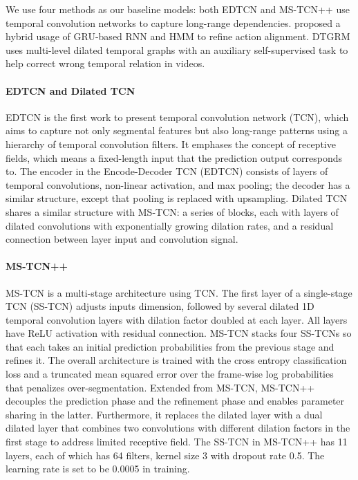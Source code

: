We use four methods as our baseline models: both EDTCN \cite{8099596} and MS-TCN++ \cite{9186840} use temporal convolution networks to capture long-range dependencies. \cite{8099623} proposed a hybrid usage of GRU-based RNN and HMM to refine action alignment. DTGRM \cite{wang2020temporal} uses multi-level dilated temporal graphs with an auxiliary self-supervised task to help correct wrong temporal relation in videos.

\paragraph{EDTCN and Dilated TCN}
EDTCN \cite{8099596} is the first work to present temporal convolution network (TCN), which aims to capture not only segmental features but also long-range patterns using a hierarchy of temporal convolution filters. It emphases the concept of receptive fields, which means a fixed-length input that the prediction output corresponds to. The encoder in the Encode-Decoder TCN (EDTCN) consists of layers of temporal convolutions, non-linear activation, and max pooling; the decoder has a similar structure, except that pooling is replaced with upsampling. Dilated TCN shares a similar structure with MS-TCN: a series of blocks, each with layers of dilated convolutions with exponentially growing dilation rates, and a residual connection between layer input and convolution signal.

\paragraph{MS-TCN++}
MS-TCN \cite{8953830} is a multi-stage architecture using TCN. The first layer of a single-stage TCN (SS-TCN) adjusts inputs dimension, followed by several dilated 1D temporal convolution layers with dilation factor doubled at each layer. All layers have ReLU activation with residual connection. MS-TCN stacks four SS-TCNs so that each takes an initial prediction probabilities from the previous stage and refines it. The overall architecture is trained with the cross entropy classification loss and a truncated mean squared error over the frame-wise log probabilities that penalizes over-segmentation. Extended from MS-TCN, MS-TCN++ \cite{9186840} decouples the prediction phase and the refinement phase and enables parameter sharing in the latter. Furthermore, it replaces the dilated layer with a dual dilated layer that combines two convolutions with different dilation factors in the first stage to address limited receptive field. The SS-TCN in MS-TCN++ has 11 layers, each of which has 64 filters, kernel size 3 with dropout rate 0.5. The learning rate is set to be 0.0005 in training.


